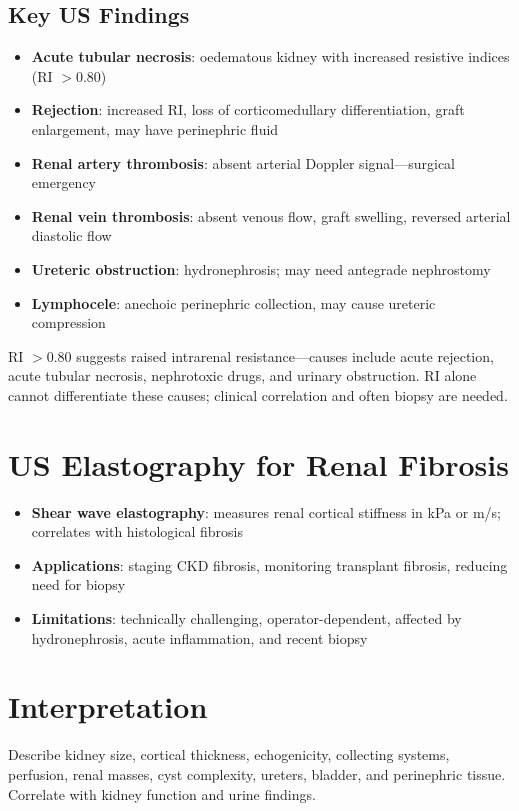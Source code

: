 \subsection{Key US Findings}
\begin{itemize}
  \item \textbf{Acute tubular necrosis}: oedematous kidney with increased resistive indices (RI $>$0.80)
  \item \textbf{Rejection}: increased RI, loss of corticomedullary differentiation, graft enlargement, may have perinephric fluid
  \item \textbf{Renal artery thrombosis}: absent arterial Doppler signal---surgical emergency
  \item \textbf{Renal vein thrombosis}: absent venous flow, graft swelling, reversed arterial diastolic flow
  \item \textbf{Ureteric obstruction}: hydronephrosis; may need antegrade nephrostomy
  \item \textbf{Lymphocele}: anechoic perinephric collection, may cause ureteric compression
\end{itemize}

\begin{pearlbox}
RI $>$0.80 suggests raised intrarenal resistance---causes include acute rejection, acute tubular necrosis, nephrotoxic drugs, and urinary obstruction. RI alone cannot differentiate these causes; clinical correlation and often biopsy are needed.
\end{pearlbox}

\section{US Elastography for Renal Fibrosis}
\begin{itemize}
  \item \textbf{Shear wave elastography}: measures renal cortical stiffness in kPa or m/s; correlates with histological fibrosis
  \item \textbf{Applications}: staging CKD fibrosis, monitoring transplant fibrosis, reducing need for biopsy
  \item \textbf{Limitations}: technically challenging, operator-dependent, affected by hydronephrosis, acute inflammation, and recent biopsy
\end{itemize}

\section{Interpretation}
Describe kidney size, cortical thickness, echogenicity, collecting systems, perfusion, renal masses, cyst complexity, ureters, bladder, and perinephric tissue. Correlate with kidney function and urine findings.

